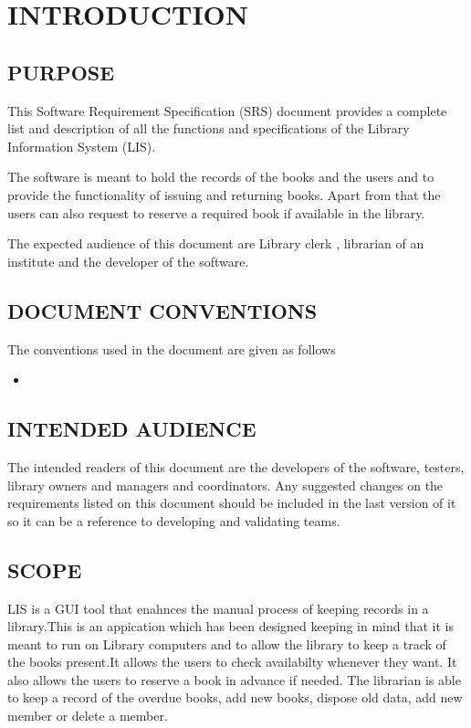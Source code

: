 \documentclass{article}
\begin{document}

\section{INTRODUCTION}

\subsection{PURPOSE}
This Software Requirement Specification (SRS) document provides a complete list and description of all the functions and specifications of the Library Information System (LIS).

The software is meant to hold the records of the books and the users and to provide the functionality of issuing and returning books. Apart from that the users can also request to reserve a required book if available in the library.

The expected audience of this document are Library clerk , librarian of an institute and the developer of the software.

\subsection{DOCUMENT CONVENTIONS}
The conventions used in the document are given as follows
\begin{itemize}
\item 
\end{itemize}
\subsection{INTENDED AUDIENCE}
The intended readers of this document are the developers of the software, testers, library owners
and managers and coordinators.
Any suggested changes on the requirements listed on this document should be included in
the last version of it so it can be a reference to developing and validating teams.
\subsection{SCOPE}
LIS is a GUI tool that enahnces the manual process of keeping records in a library.This is an appication which has been designed keeping in mind that it is meant to run on Library computers and to allow the library to keep a track of the books present.It allows the users to check availabilty whenever they want. It also allows the users to reserve a book in advance if needed. The librarian is able to keep a record of the overdue books, add new books, dispose old data, add new member or delete a member. 
\end{document}
